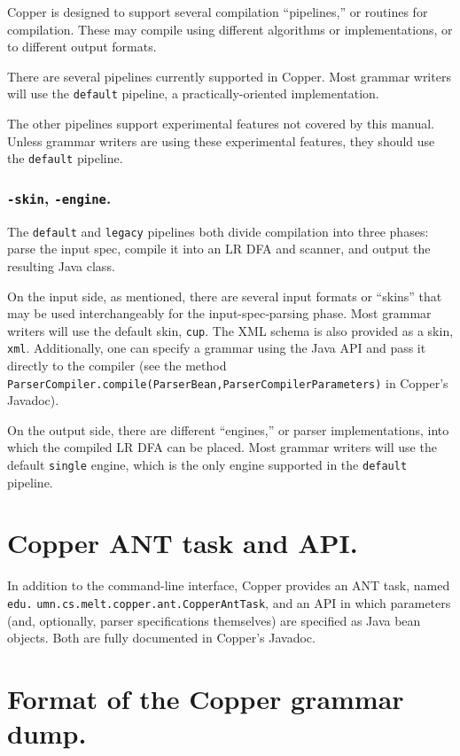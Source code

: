 \documentclass[12pt,english,twoside]{report}
\begin{document}
Copper is designed to support several compilation ``pipelines,'' or routines for compilation. These may compile using different algorithms or implementations, or to different output formats.

There are several pipelines currently supported in Copper. Most
grammar writers will use the \texttt{default} pipeline, a
practically-oriented implementation.

The other pipelines support experimental features not covered by this
manual. Unless grammar writers are using these experimental features,
they should use the \texttt{default} pipeline.

\subsubsection{\texttt{-skin}, \texttt{-engine}.}

The \texttt{default} and \texttt{legacy} pipelines both divide compilation
into three phases: parse the input spec, compile it into an LR DFA and
scanner, and output the resulting Java class.

On the input side, as mentioned, there are several input formats or
``skins'' that may be used interchangeably for the input-spec-parsing
phase. Most grammar writers will use the default skin, \texttt{cup}.
The XML schema is also provided as a skin, \texttt{xml}. Additionally,
one can specify a grammar using the Java API and pass it directly to
the compiler (see the method
\texttt{ParserCompiler.compile(ParserBean,ParserCompilerParameters)}
in Copper's Javadoc).

On the output side, there are different ``engines,'' or parser
implementations, into which the compiled LR DFA can be placed. Most
grammar writers will use the default \texttt{single} engine, which is
the only engine supported in the \texttt{default} pipeline.

\section{Copper ANT task and API.}

In addition to the command-line interface, Copper provides an ANT
task, named \texttt{edu.}
\texttt{umn.}\texttt{cs.}\texttt{melt.}\texttt{copper.}\texttt{ant.}\texttt{CopperAntTask},
and an API in which parameters (and, optionally, parser specifications
themselves) are specified as Java bean objects. Both are fully
documented in Copper's Javadoc.

\section{\label{sec:Dump-format}Format of the Copper grammar dump.}
\end{document}
